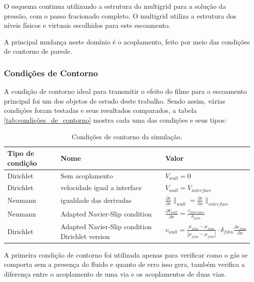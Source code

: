 O esquema continua utilizando a estrutura do multigrid para a solução da pressão, com o passo fracionado completo. O multigrid utiliza a estrutura dos níveis físicos e virtuais escolhidos para este escoamento.

A principal mudança neste domínio é o acoplamento, feito por meio das condições de contorno de parede. 

\subsubsection{Condições de Contorno}


A condição de contorno ideal para transmitir o efeito do filme para o escoamento principal foi um dos objetos de estudo deste trabalho. Sendo assim, várias condições foram testadas e seus resultados comparados, a tabela \ref{tab:condições_de_contorno} mostra cada uma das condições e seus tipos:

\begin{table}[htbp]
  \centering
  \caption{Condições de contorno da simulação.}
  \label{tab:condicoes}
  \begin{tabular}{l l l}
    \toprule
    \textbf{Tipo de condição} & \textbf{Nome} & \textbf{Valor} \\
    \midrule
    Dirichlet   & Sem acoplamento & $V_{wall} = 0$ \\
    \midrule
    Dirichlet   & velocidade igual a interface     & $V_{wall} = V_{interface}$ \\
    \midrule
    Neumann     & igualdade das derivadas     & $\frac{\partial v}{\partial x}\|_{wall} = \frac{\partial v}{\partial x}\|_{interface}$ \\
    \midrule
    Neumann   & Adapted Navier-Slip condition     & $\frac{\partial V_{wall}}{\partial x} = \frac{v_{interface}}{\delta_{film}}$ \\
    \midrule
    Dirichlet   & Adapted Navier-Slip condition Dirichlet version     & $v_{wall} = \frac{\mu_{film} - \mu_{film}}{|\mu_{film} - \mu_{film}|} \cdot \delta_{film} \frac{\partial v_{film}}{\partial x}$ \\
    \bottomrule
  \end{tabular}
\end{table}

A primeira condição de contorno foi utilizada apenas para verificar como o gás se comporta sem a presença do fluido e quanto de erro isso gera, também verifica a diferença entre o acoplamento de uma via e os acoplamentos de duas vias.

